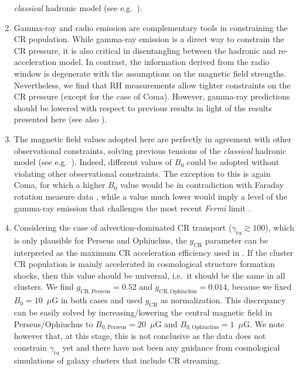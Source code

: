 \documentclass[traditabstract]{aa}
\newcommand{\rmn}{\mathrm}
\begin{document}
\begin{enumerate}
  \emph{classical} hadronic model (see e.g.~\citealp{2010MNRAS.401...47D}).
\item Gamma-ray and radio emission are complementary tools in constraining the
  CR population. While gamma-ray emission is a direct way to constrain the CR
  pressure, it is also critical in disentangling between the hadronic and
  re-acceleration model. In contrast, the information derived from the radio
  window is degenerate with the assumptions on the magnetic field
  strengths. Nevertheless, we find that RH measurements allow tighter constraints
  on the CR pressure (except for the case of Coma).  However, gamma-ray
  predictions should be lowered with respect to previous results
  \citep{2010MNRAS.409..449P,2011arXiv1105.3240P} in light of the results
  presented here (see also \citealp{2011A&A...527A..99E}).
\item The magnetic field values adopted here are perfectly in agreement with
  other observational constraints, solving previous tensions of the
  \emph{classical} hadronic model (see
  e.g.~\citealp{2011ApJ...728...53J}). Indeed, different values of $B_{0}$ could
  be adopted without violating other observational constraints. The exception to
  this is again Coma, for which a higher $B_{0}$ value would be in contradiction
  with Faraday rotation measure data \citep{2010A&A...513A..30B}, while a value
  much lower would imply a level of the gamma-ray emission that challenges the
  most recent {\em Fermi} limit \citep{2012AAS...21920701Z}.
\item Considering the case of advection-dominated CR transport
  ($\gamma_{\rmn{tu}}\gtrsim100$), which is only plausible for Perseus and
  Ophiuchus, the $g_{\rmn{CR}}$ parameter can be interpreted as the maximum CR
  acceleration efficiency used in \cite{2010MNRAS.409..449P}. If the cluster CR
  population is mainly accelerated in cosmological structure formation shocks,
  then this value should be universal, i.e.~it should be the same in all
  clusters. We find $g_{\rmn{CR, Perseus}} = 0.52$ and $g_{\rmn{CR, Ophiuchus}}
  = 0.014$, because we fixed $B_{0}=10$~$\mu$G in both cases and used
  $g_{\rmn{CR}}$ as normalization. This discrepancy can be easily solved by
  increasing/lowering the central magnetic field in Perseus/Ophiuchus to
  $B_{0,\rmn{Perseus}}=20$~$\mu$G and $B_{0,\rmn{Ophiuchus}}=1$~$\mu$G. We note
  however that, at this stage, this is not conclusive as the data does not
  constrain $\gamma_{\rmn{tu}}$ yet and there have not been any guidance from
  cosmological simulations of galaxy clusters that include CR streaming.

\end{enumerate}
\end{document}
